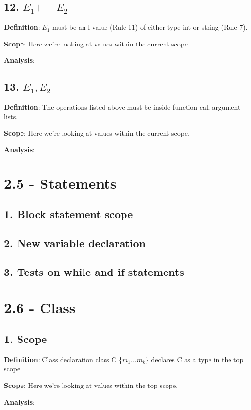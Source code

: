 \documentclass[11pt, oneside]{article}
\begin{document}
\subsection*{12. $E_1+=E_2$}
\par \textbf{Definition}: $E_1$ must be an l-value (Rule 11) of either type int or string (Rule 7).
\par \textbf{Scope}: Here we're looking at values within the current scope.
\par \textbf{Analysis}: 

\subsection*{13. $E_1,E_2$}
\par \textbf{Definition}: The operations listed above must be inside function call argument lists.
\par \textbf{Scope}: Here we're looking at values within the current scope.
\par \textbf{Analysis}: 

\section*{2.5 - Statements}

\subsection*{1. Block statement scope}

\subsection*{2. New variable declaration}

\subsection*{3. Tests on while and if statements}

\section*{2.6 - Class}

\subsection*{1. Scope}
\par \textbf{Definition}: Class declaration class C \{$m_1$...$m_k$\} declares C as a type in the top scope.
\par \textbf{Scope}: Here we're looking at values within the top scope.
\par \textbf{Analysis}: 
\end{document}
